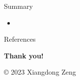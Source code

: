 \documentclass{fdubeamer}
\newcommand{\1}{\mathbb{1}}
\begin{document}
\begin{frame}{Summary}

\begin{itemize}
  \item 
\end{itemize}

\end{frame}

\begin{frame}{References}
  \tiny
  
\end{frame}

\begingroup
  \begin{frame}[plain]
    \vfill
    \begin{center}
      \color{white}
      \LARGE
      \textbf{Thank you!} \par
      \vspace{6em}
      \tiny
      \copyright{} 2023 Xiangdong Zeng
    \end{center}
    \vspace{-8em}
  \end{frame}
\endgroup
\end{document}
